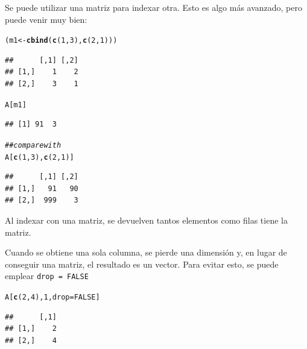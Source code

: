 \documentclass{config/apuntes}\usepackage[]{graphicx}\usepackage[]{xcolor}
\makeatletter
\newcommand{\hlnum}[1]{\textcolor[rgb]{0.686,0.059,0.569}{#1}}%
\newcommand{\hlcom}[1]{\textcolor[rgb]{0.678,0.584,0.686}{\textit{#1}}}%
\newcommand{\hldef}[1]{\textcolor[rgb]{0.345,0.345,0.345}{#1}}%
\newcommand{\hlkwb}[1]{\textcolor[rgb]{0.69,0.353,0.396}{#1}}%
\newcommand{\hlkwc}[1]{\textcolor[rgb]{0.333,0.667,0.333}{#1}}%
\newcommand{\hlkwd}[1]{\textcolor[rgb]{0.737,0.353,0.396}{\textbf{#1}}}%
\newenvironment{kframe}{%
 \def\at@end@of@kframe{}%
 \ifinner\ifhmode%
  \def\at@end@of@kframe{\end{minipage}}%
  \begin{minipage}{\columnwidth}%
 \fi\fi%
 \def\FrameCommand##1{\hskip\@totalleftmargin \hskip-\fboxsep
 \colorbox{shadecolor}{##1}\hskip-\fboxsep
     \hskip-\linewidth \hskip-\@totalleftmargin \hskip\columnwidth}%
 \MakeFramed {\advance\hsize-\width
   \@totalleftmargin\z@ \linewidth\hsize
   \@setminipage}}%
 {\par\unskip\endMakeFramed%
 \at@end@of@kframe}
\newenvironment{knitrout}{}{} %
\newcommand{\code}[1]{\texttt{#1}}
\makeatother
\begin{document}
Se puede utilizar una matriz para indexar otra. Esto es algo más avanzado, pero puede venir muy bien:
\begin{knitrout}
\color{fgcolor}\begin{kframe}
\begin{alltt}
\hldef{(m1} \hlkwb{<-} \hlkwd{cbind}\hldef{(}\hlkwd{c}\hldef{(}\hlnum{1}\hldef{,} \hlnum{3}\hldef{),} \hlkwd{c}\hldef{(}\hlnum{2}\hldef{,} \hlnum{1}\hldef{)))}
\end{alltt}
\begin{verbatim}
##      [,1] [,2]
## [1,]    1    2
## [2,]    3    1
\end{verbatim}
\begin{alltt}
\hldef{A[m1]}
\end{alltt}
\begin{verbatim}
## [1] 91  3
\end{verbatim}
\begin{alltt}
\hlcom{## compare with}
\hldef{A[}\hlkwd{c}\hldef{(}\hlnum{1}\hldef{,} \hlnum{3}\hldef{),} \hlkwd{c}\hldef{(}\hlnum{2}\hldef{,} \hlnum{1}\hldef{)]}
\end{alltt}
\begin{verbatim}
##      [,1] [,2]
## [1,]   91   90
## [2,]  999    3
\end{verbatim}
\end{kframe}
\end{knitrout}
Al indexar con una matriz, se devuelven tantos elementos como filas tiene la matriz.

Cuando se obtiene una sola columna, se pierde una dimensión y, en lugar de conseguir una matriz, el resultado es un vector. Para evitar esto, se puede emplear \code{drop = FALSE}
\begin{knitrout}
\color{fgcolor}\begin{kframe}
\begin{alltt}
\hldef{A[}\hlkwd{c}\hldef{(}\hlnum{2}\hldef{,} \hlnum{4}\hldef{),} \hlnum{1}\hldef{,} \hlkwc{drop} \hldef{=} \hlnum{FALSE}\hldef{]}
\end{alltt}
\begin{verbatim}
##      [,1]
## [1,]    2
## [2,]    4
\end{verbatim}
\end{kframe}
\end{knitrout}
\end{document}
